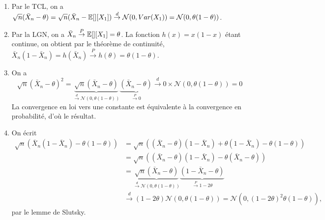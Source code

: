 \begin{solution}
  \begin{enumerate}
    \item Par le TCL, on a $\sqrt{n} ( \bar{X}_n - \theta)=\sqrt{n} ( \bar{X}_n -
            \mathbb{E}[][X_1]) \overset{d}{\rightarrow} \mathcal N(0,Var(X_1))=\mathcal N
            (0,\theta(1-\theta))$.
    \item Par la LGN, on a $\bar{X}_n \overset{P}{\rightarrow}\mathbb{E}[][X_1]=\theta$.
          La fonction $h(x)=x(1-x)$ \'etant continue, on obtient par le th\'eor\`eme de
          continuit\'e, $\bar{X}_n(1-\bar{X}_n)=h(\bar{X}_n)\overset{P}{\rightarrow}
            h(\theta)=\theta(1-\theta)$.
    \item On a
          \[
            \sqrt{n} ( \bar{X}_n - \theta)^2= \underbrace{\sqrt{n} ( \bar{X}_n -
              \theta)}_{\overset{d}{\rightarrow} \mathcal N
              (0,\theta(1-\theta))}\underbrace{( \bar{X}_n -
              \theta)}_{\overset{P}{\rightarrow} 0} \overset{d}{\rightarrow} 0\times \mathcal
            N (0,\theta(1-\theta))=0
          \]
          La convergence en loi vers une constante est
          \'equivalente \`a la convergence en probabilit\'e, d'o\`u le r\'esultat.
    \item On \'ecrit
          \begin{align*}
            \sqrt{n} \left( \bar{X}_n (1 - \bar{X}_n) - \theta(1-\theta) \right)
             & = \sqrt{n} \left( (\bar{X}_n-\theta) (1 - \bar{X}_n)+\theta(1 - \bar{X}_n) - \theta(1-\theta) \right)                                                                            \\
             & = \sqrt{n} \left( (\bar{X}_n-\theta) (1 - \bar{X}_n)-\theta( \bar{X}_n -\theta) \right)                                                                                          \\
             & = \underbrace{\sqrt{n}   (\bar{X}_n-\theta)}_{\overset{d}{\rightarrow} \mathcal N (0,\theta(1-\theta))} \underbrace{(1 - \bar{X}_n-\theta)}_{\overset{P}{\rightarrow} 1-2\theta} \\
             & \overset{d}{\rightarrow} (1-2\theta) \mathcal N (0,\theta(1-\theta))= \mathcal N (0,{(1-2\theta)}^2\theta(1-\theta)),
          \end{align*}
          par le lemme de Slutsky.
  \end{enumerate}
\end{solution}

